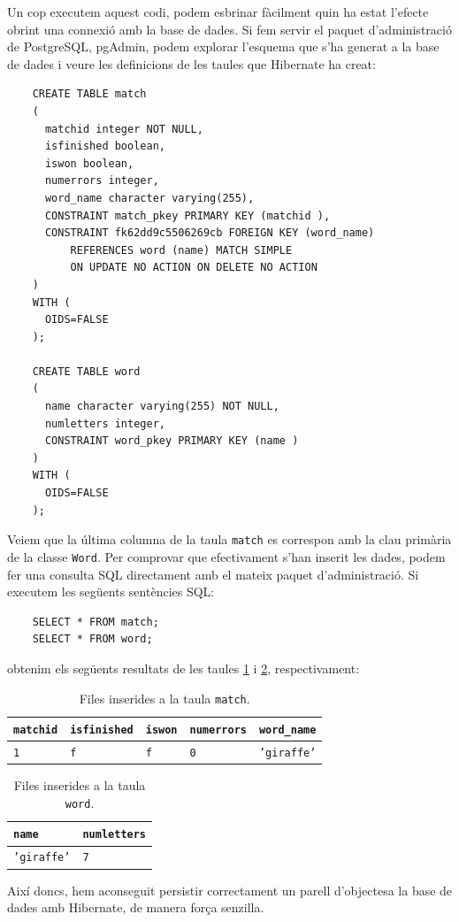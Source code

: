 Un cop executem aquest codi, podem esbrinar fàcilment quin ha estat l'efecte obrint una connexió amb la base de dades. Si fem servir el paquet d'administració de PostgreSQL, pgAdmin, podem explorar l'esquema que s'ha generat a la base de dades i veure les definicions de les taules que Hibernate ha creat:

\begin{verbatim}
    CREATE TABLE match
    (
      matchid integer NOT NULL,
      isfinished boolean,
      iswon boolean,
      numerrors integer,
      word_name character varying(255),
      CONSTRAINT match_pkey PRIMARY KEY (matchid ),
      CONSTRAINT fk62dd9c5506269cb FOREIGN KEY (word_name)
          REFERENCES word (name) MATCH SIMPLE
          ON UPDATE NO ACTION ON DELETE NO ACTION
    )
    WITH (
      OIDS=FALSE
    );
    
    CREATE TABLE word
    (
      name character varying(255) NOT NULL,
      numletters integer,
      CONSTRAINT word_pkey PRIMARY KEY (name )
    )
    WITH (
      OIDS=FALSE
    );
\end{verbatim}

Veiem que la última columna de la taula \texttt{match} es correspon amb la clau primària de la classe \texttt{Word}. Per comprovar que efectivament s'han inserit les dades, podem fer una consulta SQL directament amb el mateix paquet d'administració. Si executem les següents sentències SQL:

\begin{verbatim}
    SELECT * FROM match;
    SELECT * FROM word;
\end{verbatim}

obtenim els següents resultats de les taules \ref{table:selectmatch} i \ref{table:selectword}, respectivament:

\begin{table}[h]
	\begin{center}
		\begin{tabular}{|l|l|l|l|l|}
			\hline
			\texttt{matchid} & \texttt{isfinished} & \texttt{iswon} & \texttt{numerrors} & \texttt{word\_name} \\
			\hline \hline
			\texttt{1} & \texttt{f} & \texttt{f} & \texttt{0} & \texttt{'giraffe'} \\
			\hline
		\end{tabular}
	\end{center}
	\caption{Files inserides a la taula \texttt{match}.}
	\label{table:selectmatch}
\end{table}

\begin{table}[h]
	\begin{center}
		\begin{tabular}{|l|l|}
			\hline
			\texttt{name} & \texttt{numletters} \\
			\hline \hline
			\texttt{'giraffe'} & \texttt{7} \\
			\hline
		\end{tabular}
	\end{center}
	\caption{Files inserides a la taula \texttt{word}.}
	\label{table:selectword}
\end{table}

Així doncs, hem aconseguit persistir correctament un parell d'objectesa la base de dades amb Hibernate, de manera força senzilla.